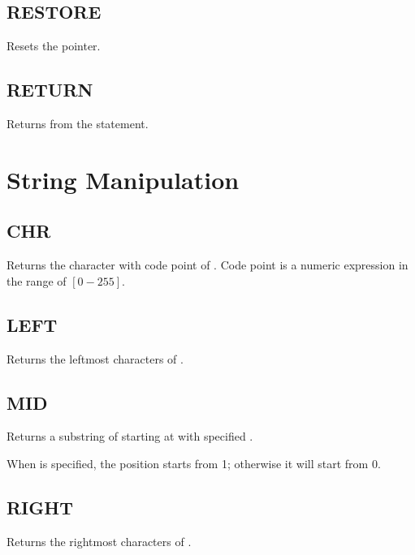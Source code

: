     \subsection{RESTORE}
        \par
        Resets the  pointer.
    \subsection{RETURN}
        \par
        Returns from the  statement.

\section{String Manipulation}

    \subsection{CHR}
        \par
        Returns the character with code point of . Code point is a numeric expression in the range of $[0-255]$.
    \subsection{LEFT}
        \par
        Returns the leftmost  characters of .
    \subsection{MID}
        \par
        Returns a substring of  starting at  with specified .\par
        When  is specified, the position starts from 1; otherwise it will start from 0. 
    \subsection{RIGHT}
        \par
        Returns the rightmost  characters of .

